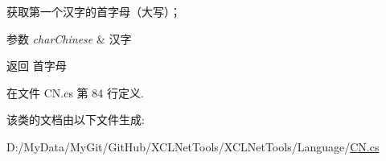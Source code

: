 获取第一个汉字的首字母（大写）； 


\begin{DoxyParams}{参数}
{\em char\-Chinese} & 汉字\\
\hline
\end{DoxyParams}
\begin{DoxyReturn}{返回}
首字母
\end{DoxyReturn}


在文件 C\-N.\-cs 第 84 行定义.



该类的文档由以下文件生成\-:\begin{DoxyCompactItemize}
\item 
D\-:/\-My\-Data/\-My\-Git/\-Git\-Hub/\-X\-C\-L\-Net\-Tools/\-X\-C\-L\-Net\-Tools/\-Language/\hyperlink{_c_n_8cs}{C\-N.\-cs}\end{DoxyCompactItemize}
